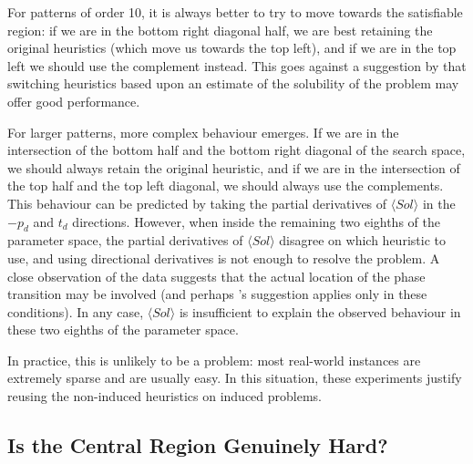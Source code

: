 \documentclass[twoside,11pt]{article}
\newcommand{\citet}[1]{\citeA{#1}}
\begin{document}
For patterns of order 10, it is always better to try to move towards the satisfiable region: if we
are in the bottom right diagonal half, we are best retaining the original heuristics (which move us
towards the top left), and if we are in the top left we should use the complement instead. This
goes against a suggestion by \citet{DBLP:conf/aaai/Walsh98} that switching heuristics based upon an estimate of
the solubility of the problem may offer good performance.

For larger patterns, more complex behaviour emerges. If we are in the intersection of the bottom half
and the bottom right diagonal of the search space, we should always retain the original heuristic,
and if we are in the intersection of the top half and the top left diagonal, we should always use
the complements. This behaviour can be predicted by taking the partial derivatives of $\langle Sol
\rangle$ in the $-p_d$ and $t_d$ directions.  However, when inside the remaining two eighths of the
parameter space, the partial derivatives of $\langle Sol \rangle$ disagree on which heuristic to
use, and using directional derivatives is not enough to resolve the problem. A close observation of
the data suggests that the actual location of the phase transition may be involved (and perhaps
\citeauthor{DBLP:conf/aaai/Walsh98}'s suggestion applies only in these conditions). In any case, $\langle Sol
\rangle$ is insufficient to explain the observed behaviour in these two eighths of the parameter space.

In practice, this is unlikely to be a problem: most real-world instances are extremely sparse and
are usually easy. In this situation, these experiments justify reusing the
non-induced heuristics on induced problems.

\subsection{Is the Central Region Genuinely Hard?}
\end{document}
